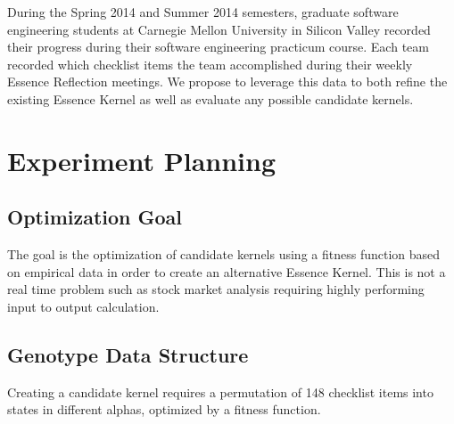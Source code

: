 \documentclass[preprint,12pt,3p]{elsarticle}
\begin{document}
During the Spring 2014 and Summer 2014 semesters, graduate software engineering students at Carnegie Mellon University in Silicon Valley recorded their progress during their software engineering practicum course. Each team recorded which checklist items the team accomplished during their weekly Essence Reflection meetings. We propose to leverage this data to both refine the existing Essence Kernel as well as evaluate any possible candidate kernels. 


\section{Experiment Planning}
\subsection{Optimization Goal}
\label{Optimization Application}
The goal is the optimization of candidate kernels using a fitness function based on empirical data in order to create an alternative Essence Kernel. This is not a real time problem such as stock market analysis requiring highly performing input to output calculation.


\subsection{Genotype Data Structure}

Creating a candidate kernel requires a permutation of 148 checklist items into states in different alphas, optimized by a fitness function.

\end{document}
